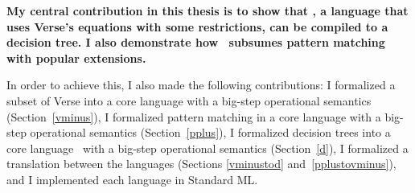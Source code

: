 \documentclass[manuscript,screen,review, 12pt, nonacm]{acmart}
\begin{document}
\bf{My central contribution in this thesis} is to show that \VMinus, a language
that uses Verse's equations with some restrictions, can be compiled to a
decision tree. I also demonstrate how \VMinus\ subsumes pattern matching with
popular extensions. 

In order to achieve this, I also made the following contributions: I formalized
a subset of Verse into a core language \VMinus with a big-step operational
semantics (Section~\ref{vminus}), I formalized pattern matching in a core
language \PPlus with a big-step operational semantics (Section~\ref{pplus}), I
formalized decision trees into a core language \D\ with a big-step operational
semantics (Section~\ref{d}), I formalized a translation between the languages
(Sections \ref{vminustod} and~\ref{pplustovminus}), and I implemented each
language in Standard ML. 
\end{document}
